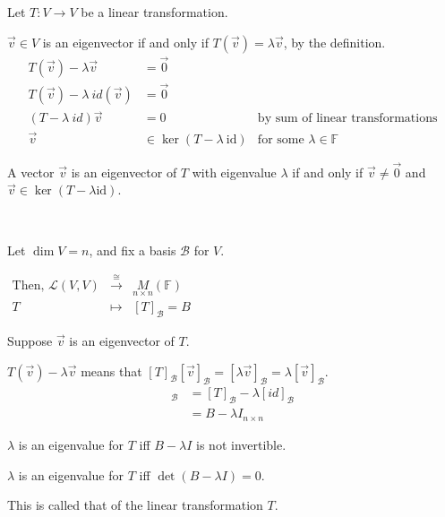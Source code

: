 \documentclass[11pt,fleqn]{book} %
\begin{document}
Let $T: V \to V$ be a linear transformation.

$\vec{v} \in V$  is an eigenvector if and only if $T(\vec{v}) = \lambda \vec{v}$, by the definition.
\begin{align*}
    T(\vec{v}) - \lambda \vec{v}
    &= \vec{0}
    \\
    T(\vec{v}) - \lambda ~ id(\vec{v})
    &= \vec{0}
    \\
    (T-\lambda ~ id)\vec{v}
    &= 0
    &\text{by sum of linear transformations}
    \\
    \vec{v} &\in \ker (T - \lambda ~ \mathrm{id}) &\text{for some }\lambda \in \mathbb{F}
\end{align*}

\setcounter{chapter}{4}
\setcounter{dummy}{4}
\begin{proposition}
    A vector $\vec{v}$ is an eigenvector of $T$ with eigenvalue $\lambda$ if and only if $\vec{v} \neq \vec{0}$ and $\vec{v} \in \ker(T - \lambda \mathrm{id})$.
\end{proposition}
\setcounter{chapter}{3}


\begin{example}
{~~~}

    Let $\dim V = n$, and fix a basis $\mathcal{B}$ for $V$. 

    $\begin{matrix} \text{Then, } \mathcal{L}(V, V) &\overset{\cong}{\to} &\underset{n \times n}M(\mathbb{F}) \\ T &\mapsto &[T]_\mathcal{B} = B \end{matrix}$

    Suppose $\vec{v}$ is an eigenvector of $T$.

    $T(\vec{v}) - \lambda \vec{v}$ means that $[T]_\mathcal{B}[\vec{v}]_\mathcal{B} = [\lambda\vec{v}]_\mathcal{B} = \lambda [\vec{v}]_\mathcal{B}$.
    \begin{align*}
        [T - \lambda ~ id]_\mathcal{B}
        &= [T]_\mathcal{B} - \lambda[id]_\mathcal{B}
        \\
        &={B - \lambda I}_{n \times n}
    \end{align*}

    $\lambda$ is an eigenvalue for $T$ iff $B - \lambda I$ is not invertible.

    $\lambda$ is an eigenvalue for $T$ iff $\det (B - \lambda I) = 0$.

    This is called that  of the linear transformation $T$.
\end{example}
\end{document}
